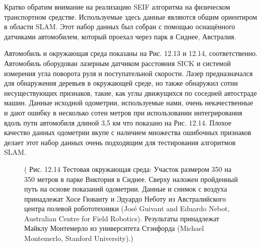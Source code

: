 \documentclass[10pt,a4paper]{article}
\begin{document}
Кратко обратим внимание на реализацию SEIF алгоритма на физическом транспортном средстве. Используемые здесь данные являются общим ориентиром в области SLAM. Этот набор данных был собран с помощью оснащённого датчиками автомобилем, который проехал через парк в Сиднее, Австралия.

Автомобиль и окружающая среда показаны на Рис. 12.13 и 12.14, соответственно. Автомобиль оборудован лазерным датчиком расстояния SICK и системой измерения угла поворота руля и поступательной скорости. Лазер предназначался для обнаружения деревьев в окружающей среде, но также обнаружил сотни несуществующих признаков, такие, как углы движущихся по соседней автостраде машин. Данные исходной одометрии, используемые нами, очень некачественные и дают ошибку в несколько сотен метров при использовании интегрирования вдоль пути автомобиля длиной 3,5 км что показано на Рис. 12.14. Плохое качество данных одометрии вкупе с наличием множества ошибочных признаков делает этот набор данных очень подходящим для тестирования алгоритмов SLAM. 

\begin{figure}[H]
	\caption{ (  Рис. 12.14 Тестовая окружающая среда: Участок размером 350 на 350 метров в парке Виктория в Сиднее. Сверху наложен пройденный путь на основе показаний одометрии. Данные и снимок с воздуха принадлежат Хосе Гюванту и Эдуардо Неботу из Австралийского центра полевой робототехники (José Guivant and Eduardo Nebot, Australian Centre for Field Robotics). Результаты принадлежат Майклу Монтемерло из университета Стэнфорда (Michael Montemerlo, Stanford University).) }
	\label{fig:1214orig}
\end{figure}
\end{document}
